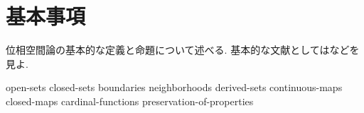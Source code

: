 \documentclass[uplatex, dvipdfmx, a4paper, 12pt, class=jsbook, crop=false]{standalone}
\begin{document}
\chapter{基本事項}
\label{chap:basics}

位相空間論の基本的な定義と命題について述べる.
基本的な文献としては\cite{Engelking1989GT, Dugundji1966T, Morita1981ja, KodamaNagami1974ja}などを見よ.

{open-sets}
{closed-sets}
{boundaries}
{neighborhoods}
{derived-sets}
{continuous-maps}
{closed-maps}
{cardinal-functions}
{preservation-of-properties}
\end{document}
